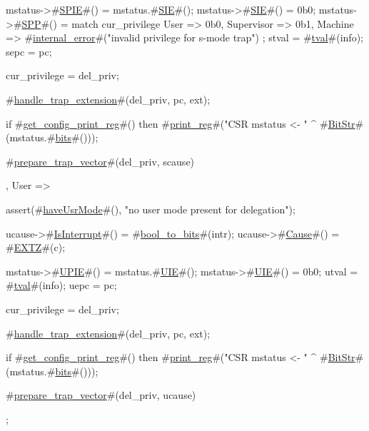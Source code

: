 {{{       mstatus->#\hyperref[sailRISCVzSPIE]{SPIE}#() = mstatus.#\hyperref[sailRISCVzSIE]{SIE}#();
       mstatus->#\hyperref[sailRISCVzSIE]{SIE}#()  = 0b0;
       mstatus->#\hyperref[sailRISCVzSPP]{SPP}#()  = match cur_privilege {
                           User => 0b0,
                           Supervisor => 0b1,
                           Machine => #\hyperref[sailRISCVzinternalzyerror]{internal\_error}#("invalid privilege for s-mode trap")
                         };
       stval           = #\hyperref[sailRISCVztval]{tval}#(info);
       sepc            = pc;

       cur_privilege   = del_priv;

       #\hyperref[sailRISCVzhandlezytrapzyextension]{handle\_trap\_extension}#(del_priv, pc, ext);

       if   #\hyperref[sailRISCVzgetzyconfigzyprintzyreg]{get\_config\_print\_reg}#()
       then #\hyperref[sailRISCVzprintzyreg]{print\_reg}#("CSR mstatus <- " ^ #\hyperref[sailRISCVzBitStr]{BitStr}#(mstatus.#\hyperref[sailRISCVzbits]{bits}#()));

       #\hyperref[sailRISCVzpreparezytrapzyvector]{prepare\_trap\_vector}#(del_priv, scause)
    },
    User => {
       assert(#\hyperref[sailRISCVzhaveUsrMode]{haveUsrMode}#(), "no user mode present for delegation");

       ucause->#\hyperref[sailRISCVzIsInterrupt]{IsInterrupt}#() = #\hyperref[sailRISCVzboolzytozybits]{bool\_to\_bits}#(intr);
       ucause->#\hyperref[sailRISCVzCause]{Cause}#()       = #\hyperref[sailRISCVzEXTZ]{EXTZ}#(c);

       mstatus->#\hyperref[sailRISCVzUPIE]{UPIE}#() = mstatus.#\hyperref[sailRISCVzUIE]{UIE}#();
       mstatus->#\hyperref[sailRISCVzUIE]{UIE}#()  = 0b0;
       utval           = #\hyperref[sailRISCVztval]{tval}#(info);
       uepc            = pc;

       cur_privilege   = del_priv;

       #\hyperref[sailRISCVzhandlezytrapzyextension]{handle\_trap\_extension}#(del_priv, pc, ext);

       if   #\hyperref[sailRISCVzgetzyconfigzyprintzyreg]{get\_config\_print\_reg}#()
       then #\hyperref[sailRISCVzprintzyreg]{print\_reg}#("CSR mstatus <- " ^ #\hyperref[sailRISCVzBitStr]{BitStr}#(mstatus.#\hyperref[sailRISCVzbits]{bits}#()));

       #\hyperref[sailRISCVzpreparezytrapzyvector]{prepare\_trap\_vector}#(del_priv, ucause)
    }
  };
}
